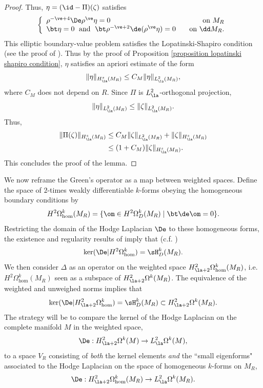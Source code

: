 \documentclass[hidelinks, 12pt, oneside, reqno]{amsart}
\begin{document}
\begin{proof}
    Thus, $\eta = (\id - \Pi)(\zeta)$ satisfies 
    \begin{equation}\label{equation dirichlet harmonic bounds}
    \left\{
    \begin{array}{lr}
    \rho^{-\ve + 4}\De \rho^{\ve} \eta = 0  & \;\; \text{ on } M_R\\ 
    \bt \eta = 0 \;\text{ and }\; \bt \rho^{-\ve + 2}\de (\rho^{\ve} \eta) = 0 & \;\; \text{ on } \dd M_R.
    \end{array}
    \right.
    \end{equation}
    This elliptic boundary-value problem satisfies the Lopatinski-Shapiro condition (see the proof of \cite[Lemma 1.6.5]{HodgeDecompSchwarz}). Thus by the proof of Proposition \ref{proposition lopatinski shapiro condition}, $\eta$ satisfies an apriori estimate of the form 
    \[
    \|\eta\|_{H^s_\la(M_R)} \le C_M \| \eta \|_{L^2_\la(M_R)},
    \]
    where $C_M$ does not depend on $R$. Since $\Pi$ is $L^2_\la$-orthogonal projection, 
    \[
    \|\eta\|_{L^2_\la(M_R)} \le \|\zeta\|_{L^2_\la(M_R)}. 
    \]
    Thus,
    \begin{align*}
        \|\Pi(\zeta)\|_{H^s_\la(M_R)} &\le C_M\|\zeta\|_{L^2_\la(M_R)} + \|\zeta\|_{H^s_\la(M_R)}\\
        &\le (1 + C_M)\|\zeta\|_{H^s_\la(M_R)}.
    \end{align*}
    This concludes the proof of the lemma.
\end{proof}

We now reframe the Green's operator as a map between weighted spaces. Define the space of $2$-times weakly differentiable $k$-forms obeying the homogeneous boundary conditions by
\[
H^{2}\Omega^k_{\mathrm{hom}} (M_R) = \{\om \in H^{2}\Omega_D^k(M_R) \;|\; \bt \de \om = 0\}.
\]
Restricting the domain of the Hodge Laplacian $\De$ to these homogeneous forms, the existence and regularity results of \cite[Theorems 2.2.4-6]{HodgeDecompSchwarz} imply that (c.f. \cite[p. 78]{HodgeDecompSchwarz})
\[
\ker(\De| H^{2}\Omega^k_{\mathrm{hom}} ) = \sH^k_D(M_R).
\]
We then consider $\Delta$ as an operator on the weighted space $H_{\la+2}^{2}\Omega^k_{\mathrm{hom}} (M_R)$, i.e. $H^{2}\Omega^k_{\mathrm{hom}} (M_R)$ seen as a subspace of $H^{2}_{\la+2}\Omega^k(M_R)$. The equivalence of the weighted and unweighed norms implies that
\[
\ker(\De| H_{\la+2}^{2}\Omega^k_{\mathrm{hom}} ) = \sH_D^k(M_R) \subset H_{\la+2}^{2}\Omega^k (M_R).
\]
The strategy will be to compare the kernel of the Hodge Laplacian on the complete manifold $M$ in the weighted space,
\[
\De: H^{2}_{\la + 2}\Omega^k(M) \rightarrow L^{2}_{\la}\Omega^k(M),
\]
to a space $V_R$ consisting of \emph{both} the kernel elements \emph{and} the ``small eigenforms" associated to the Hodge Laplacian on the space of homogeneous $k$-forms on $M_R$, 
\[
\De : H^{2}_{\la + 2}\Omega^k_{\mathrm{hom}}(M_R) \rightarrow L^{2}_{\la}\Omega^k(M_R).
\]
\end{document}
